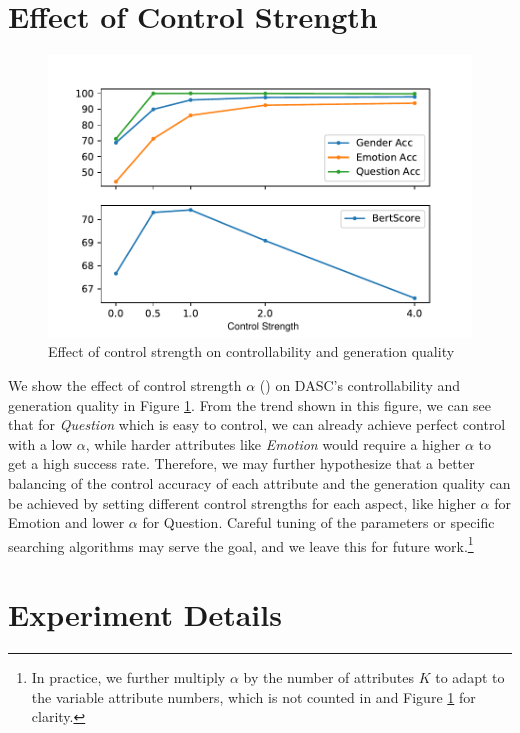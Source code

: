 
\appendix

\section{Effect of Control Strength}

\begin{figure}[ht]
    \centering
    \includegraphics[width=1.0\columnwidth]{figures/parameter_tune.pdf}
    \caption{Effect of control strength on controllability and generation quality}
    \label{fig:parameter_tune}
\end{figure}

We show the effect of control strength $\alpha$ () on DASC's controllability and generation quality in Figure \ref{fig:parameter_tune}. From the trend shown in this figure, we can see that for \textit{Question} which is easy to control, we can already achieve perfect control with a low $\alpha$, while harder attributes like \textit{Emotion} would require a higher $\alpha$ to get a high success rate. Therefore, we may further hypothesize that a better balancing of the control accuracy of each attribute and the generation quality can be achieved by setting different control strengths for each aspect, like higher $\alpha$ for Emotion and lower $\alpha$ for Question. Careful tuning of the parameters or specific searching algorithms \citep{gu2022distributional} may serve the goal, and we leave this for future work.\footnote{In practice, we further multiply $\alpha$ by the number of attributes $K$ to adapt to the variable attribute numbers, which is not counted in  and Figure \ref{fig:parameter_tune} for clarity.}

\section{Experiment Details}

